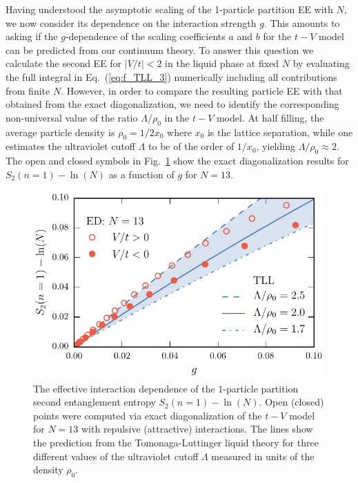 Having understood the asymptotic scaling of the 1-particle partition \ren EE
with $N$, we now consider its dependence on the interaction strength $g$.  This
amounts to asking if the $g$-dependence of the scaling coefficients $a$ and $b$
for the $t-V$ model can be predicted from our continuum theory.  To answer this
question we calculate the second \ren EE for $|V/t| < 2$ in the liquid phase at
fixed $N$ by evaluating the full integral in Eq.~(\ref{eq:f_TLL_3}) numerically
including all contributions from finite $N$.
However, in order to compare the resulting particle EE with that obtained from
the exact diagonalization, we need to identify the corresponding non-universal
value of the ratio $\Lambda/\rho_0$ in the $t-V$ model. At half filling, the
average particle density is $\rho_0=1/2x_0$ where $x_0$ is the lattice
separation, while one estimates the ultraviolet cutoff $\Lambda$ to be of the
order of $1/x_0$, yielding $\Lambda/\rho_0 \approx 2$.  The open and closed
symbols in Fig.~\ref{fig:Svsg} show the exact diagonalization results for
$S_2(n=1)-\ln(N)$ as a function of $g$ for $N=13$.  
%
\begin{figure}[h]
\begin{center}
\includegraphics[width=0.7\columnwidth]{Chapters/PPE_interaction_dependence.pdf}
\end{center}
\caption{The effective interaction dependence of the $1$-particle partition
second \ren entanglement entropy $S_2(n=1)-\ln(N)$.  Open (closed)
points were computed via exact diagonalization of the $t-V$ model for $N=13$
with repulsive (attractive) interactions.  The lines show the prediction from
the Tomonaga-Luttinger liquid theory for three different values of the
ultraviolet cutoff $\Lambda$ measured in units of the density $\rho_0$.} 
\label{fig:Svsg}
 \end{figure}

